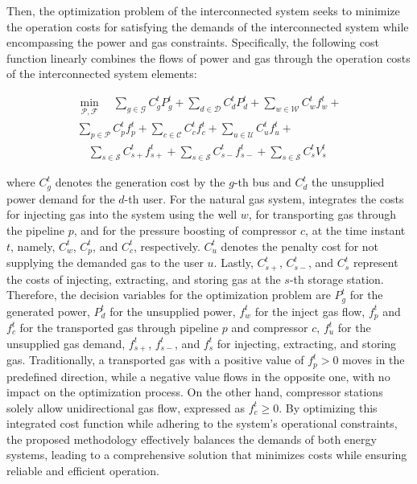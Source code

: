 Then, the optimization problem of the interconnected system seeks to minimize the operation costs for satisfying the demands of the interconnected system while encompassing the power and gas constraints. Specifically, the following cost function linearly combines the flows of power and gas through the operation costs of the interconnected system elements:

\begin{equation} \label{eq:obj_func_integrated}
\begin{split}
\min_{\mathcal{P}, \mathcal{F}} \quad  \sum_{g \in \mathcal{G}} C_{g}^t {P_{g}^t} + \sum_{d \in \mathcal{D}} C_{d}^t {P_{d}^t} +  \sum_{w \in \mathcal{W}} C_{w}^t {f_{w}^t} + \\ \sum_{p \in \mathcal{P}} C_{p}^t {f_{p}^t}  + \sum_{c \in \mathcal{C}} C_{c}^t {f_{c}^t} + \sum_{u \in \mathcal{U}} C_{u}^{t} {f_{u}^{t}} + \\ \quad \sum_{s \in \mathcal{S}} C_{s+}^{t} {f_{s+}^{t}}  + \sum_{s \in \mathcal{S}} C_{s-}^{t} {f_{s-}^{t}} + \sum_{s \in \mathcal{S}} C_{s}^{t} {V_{s}^{t}}
\end{split}
\end{equation}

where $C_g^t$ denotes the generation cost by the $g$-th bus and $C_d^t$ the unsupplied power demand for the $d$-th user. For the natural gas system,  integrates the costs for injecting gas into the system using the well $w$, for transporting gas through the pipeline $p$, and for the pressure boosting of compressor $c$, at the time instant $t$, namely, $C_w^t$, $C_p^t$, and $C_c^t$, respectively. $C_u^t$ denotes the penalty cost for not supplying the demanded gas to the user $u$. Lastly, $C_{s+}^t$, $C_{s-}^t$, and $C_{s}^t$ represent the costs of injecting, extracting, and storing gas at the $s$-th storage station. Therefore, the decision variables for the optimization problem are $P_g^t$ for the generated power, $P_d^t$ for the unsupplied power, $f_w^t$ for the inject gas flow, $f_p^t$ and $f_c^t$ for the transported gas through pipeline $p$ and compressor $c$, $f_u^t$ for the unsupplied gas demand, $f_{s+}^t$, $f_{s-}^t$, and $f_{s}^t$ for injecting, extracting, and storing gas. Traditionally, a transported gas with a positive value of $ f_ { p } ^t>0 $ moves in the predefined direction, while a negative value flows in the opposite one, with no impact on the optimization process. On the other hand, compressor stations solely allow unidirectional gas flow, expressed as $f_{c}^t\geq0$. By optimizing this integrated cost function while adhering to the system's operational constraints, the proposed methodology effectively balances the demands of both energy systems, leading to a comprehensive solution that minimizes costs while ensuring reliable and efficient operation.

